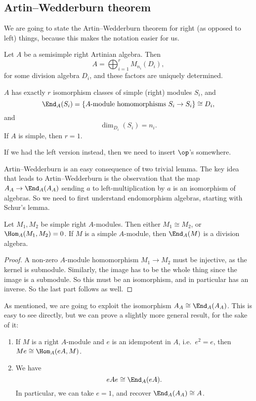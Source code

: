 \documentclass[a4paper]{article}
\begin{document}
\subsection{Artin--Wedderburn theorem}
We are going to state the Artin--Wedderburn theorem for right (as opposed to left) things, because this makes the notation easier for us.
\begin{thm}
  Let $A$ be a semisimple right Artinian algebra. Then
  \[
    A = \bigoplus_{i = 1}^r M_{n_i}(D_i),
  \]
  for some division algebra $D_i$, and these factors are uniquely determined.

  $A$ has exactly $r$ isomorphism classes of simple (right) modules $S_i$, and
  \[
    \End_A (S_i) = \{\text{$A$-module homomorphisms $S_i \to S_i$}\} \cong D_i,
  \]
  and
  \[
    \dim_{D_i}(S_i) = n_i.
  \]
  If $A$ is simple, then $r = 1$.
\end{thm}
If we had the left version instead, then we need to insert $\op$'s somewhere.

Artin--Wedderburn is an easy consequence of two trivial lemma. The key idea that leads to Artin--Wedderburn is the observation that the map $A_A \to \End_A(A_A)$ sending $a$ to left-multiplication by $a$ is an isomorphism of algebras. So we need to first understand endomorphism algebras, starting with Schur's lemma.

\begin{lemma}
  Let $M_1, M_2$ be simple right $A$-modules. Then either $M_1 \cong M_2$, or $\Hom_A(M_1, M_2) = 0$. If $M$ is a simple $A$-module, then $\End_A(M)$ is a division algebra.
\end{lemma}

\begin{proof}
  A non-zero $A$-module homomorphism $M_1 \to M_2$ must be injective, as the kernel is submodule. Similarly, the image has to be the whole thing since the image is a submodule. So this must be an isomorphism, and in particular has an inverse. So the last part follows as well.
\end{proof}

As mentioned, we are going to exploit the isomorphism $A_A \cong \End_A(A_A)$. This is easy to see directly, but we can prove a slightly more general result, for the sake of it:
\begin{lemma}\leavevmode
  \begin{enumerate}
    \item If $M$ is a right $A$-module and $e$ is an idempotent in $A$, i.e.\ $e^2 = e$, then $Me \cong \Hom_A(eA, M)$.
    \item We have
      \[
        eAe \cong \End_A(eA).
      \]
      In particular, we can take $e = 1$, and recover $\End_A(A_A) \cong A$.
  \end{enumerate}
\end{lemma}
\end{document}
